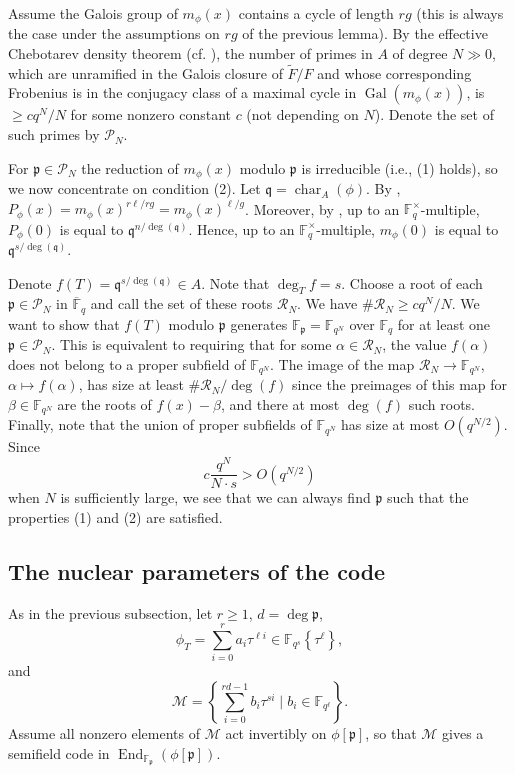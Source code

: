 \documentclass[12pt]{amsart}
\theoremstyle{definition}
\theoremstyle{remark}
\numberwithin{equation}{section}
\numberwithin{thm}{section}
\DeclareMathOperator{\End}{End}
\DeclareMathOperator{\chr}{char}
\DeclareMathOperator{\Gal}{Gal}
\newcommand{\fp}{\mathfrak{p}}
\newcommand{\fq}{\mathfrak{q}}
\newcommand{\cM}{\mathcal{M}}
\newcommand{\cP}{\mathcal{P}}
\renewcommand{\cR}{\mathcal{R}}
\newcommand{\F}{\mathbb{F}}
\newcommand{\tF}{\widetilde{F}}
\newcommand{\twistt}[2]{#1\!\left\{#2\right\}}
\begin{document}
Assume the Galois group of $m_\phi(x)$ contains a cycle of length $rg$ (this is always the case under the assumptions on $rg$ of the previous lemma). 
By the effective Chebotarev density theorem (cf. \cite{MuSch}), 
the number of primes in $A$ of degree $N\gg 0$, which are unramified in the Galois closure of $\tF/F$ and whose corresponding Frobenius is in the conjugacy class of a maximal cycle in $\Gal(m_\phi(x))$, is $\geq cq^N/N$ for some nonzero constant $c$ (not depending on $N$). Denote the set of such primes by $\cP_N$. 

For $\fp\in \cP_N$ the reduction of $m_\phi(x)$ modulo $\fp$ is irreducible (i.e., (1) holds), so we now concentrate on condition (2).  
Let $\fq=\chr_A(\phi)$. By \cite[Thm. 4.2.2]{PapikianGTM}, $P_\phi(x)=m_\phi(x)^{r\ell/rg}=m_\phi(x)^{\ell/g}$. Moreover, by 
\cite[Thm. 4.2.7]{PapikianGTM}, up to an $\F_q^\times$-multiple, $P_\phi(0)$ is equal to $\fq^{n/\deg(\fq)}$. Hence, up to an $\F_q^\times$-multiple, 
$m_\phi(0)$ is equal to $\fq^{s/\deg(\fq)}$. %

Denote $f(T)=\fq^{s/\deg(\fq)}\in A$. Note that $\deg_T f=s$. Choose a root of each $\fp\in \cP_N$ in $\overline{\F}_q$ and call the set of these roots $\cR_N$. We have 
$\# \cR_N\geq  cq^N/N$. We want to show that $f(T)$ modulo $\fp$ generates $\F_\fp=\F_{q^N}$ over $\F_q$ for at least one $\fp\in \cP_N$. 
This is equivalent to requiring that for some $\alpha\in \cR_N$, the value $f(\alpha)$ 
does not belong to a proper subfield of $\F_{q^N}$.
The image of the map $\cR_N\to \F_{q^N}$, $\alpha\mapsto f(\alpha)$, has size at least $\# \cR_N/\deg(f)$ since the preimages of this map for $\beta\in \F_{q^N}$ 
are the roots of $f(x)-\beta$, and there at most $\deg(f)$ such roots. Finally, note that the union of proper subfields of $\F_{q^N}$ has size at most $O(q^{N/2})$. 
Since 
$$
c\frac{q^N}{N\cdot s} > O(q^{N/2})
$$ 
when $N$ is sufficiently large, we see that we can always find $\fp$ such that the properties (1) and (2) are satisfied. 

 \subsection{The nuclear parameters of the code} As in the previous subsection, let  $r\geq 1$, $d=\deg \fp$, 
\[
\phi_T=\sum_{i=0}^r a_i \tau^{\ell i} \in \twistt{\F_{q^s}}{\tau^\ell},
\]
and 
\begin{equation}\label{eqcM}
\cM=\left\{\sum_{i=0}^{rd-1} b_i\tau^{s i}\mid b_i\in \F_{q^\ell}\right\}. 
\end{equation}
Assume all nonzero elements of $\cM$ act invertibly on $\phi[\fp]$, so that $\cM$ gives a semifield code in $\End_{\F_\fp}(\phi[\fp])$. 
\end{document}
